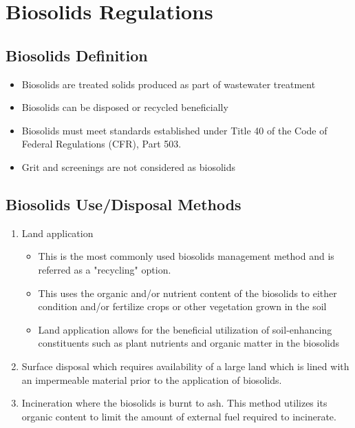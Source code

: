 




\chapter{Biosolids Regulations}

\section{Biosolids Definition}

		\begin{itemize}
			\item Biosolids are treated solids produced as part of wastewater treatment
			\item Biosolids can be disposed or recycled beneficially
			\item Biosolids must meet standards established under Title 40 of the Code of Federal Regulations (CFR), Part 503.  
			\item Grit and screenings are not considered as biosolids
		\end{itemize}
	
\section{Biosolids Use/Disposal Methods}
	
			\begin{enumerate}[1.]
				\item Land application
					\begin{itemize}
						\item This is the most commonly used biosolids management method and is referred as a "recycling" option.
						\item This uses the organic and/or nutrient content of the biosolids to either condition and/or fertilize crops or other vegetation grown in the soil
						\item Land application allows for the beneficial utilization of soil-enhancing constituents such as plant nutrients and organic matter in the biosolids
					\end{itemize}
				\item Surface disposal which requires availability of a large land which is lined with an impermeable material prior to the application of biosolids. 
				\item Incineration where the biosolids is burnt to ash.  This method utilizes its organic content to limit the amount of external fuel required to incinerate.  
			\end{enumerate}

